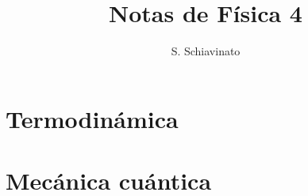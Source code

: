 \documentclass{book}
\title{Notas de Física 4}
\author{S. Schiavinato}
\date{}
\numberwithin{equation}{section} %
\begin{document}
\maketitle
\tableofcontents

\chapter{Termodinámica}


\chapter{Mecánica cuántica}

\end{document}
